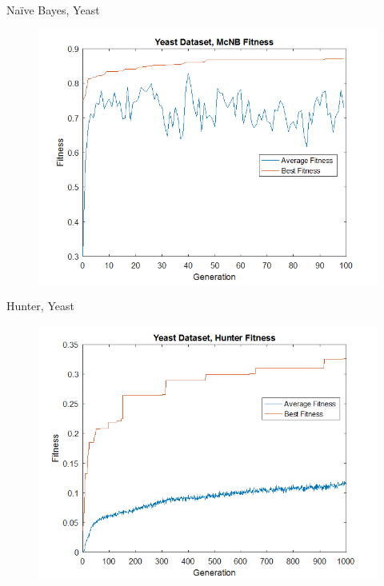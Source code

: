 \documentclass{beamer}
\begin{document}
\begin{frame} {Na\"ive Bayes, Yeast}
	\begin{figure}
		\centering
		\includegraphics[width=.95\linewidth]{figures/png/yeastmcnb}
		\label{fig:fitnessyeastmcnb}
	\end{figure}
	
\end{frame}

\begin{frame} {Hunter, Yeast}
	\begin{figure}
		\centering
		\includegraphics[width=.95\linewidth]{figures/png/yeastHunter}
		\label{fig:fitnessYeastHunter}
	\end{figure}
	
\end{frame}
\end{document}

